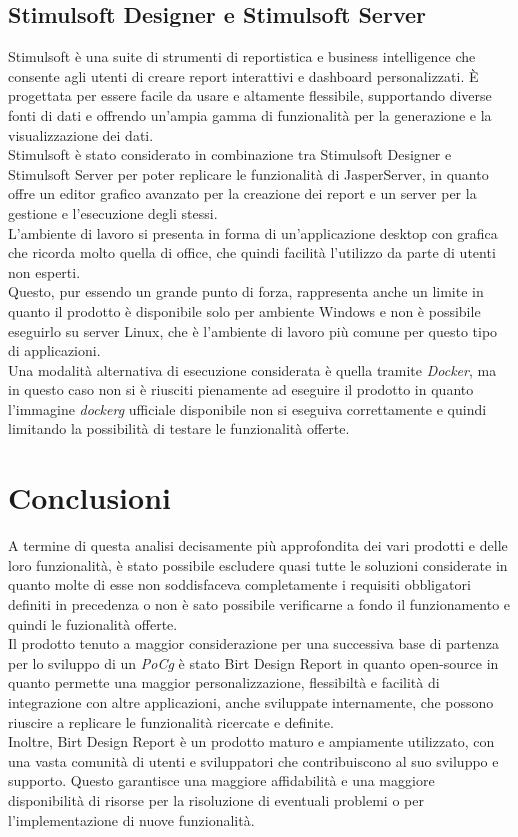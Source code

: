     \subsection{Stimulsoft Designer e Stimulsoft Server}
    \label{sec:Stimulsoft}
    Stimulsoft è una suite di strumenti di reportistica e business intelligence che consente agli utenti di creare report interattivi e dashboard personalizzati. È progettata per essere facile da usare e altamente flessibile, supportando diverse fonti di dati e offrendo un'ampia gamma di funzionalità per la generazione e la visualizzazione dei dati.\\
    Stimulsoft è stato considerato in combinazione tra Stimulsoft Designer e Stimulsoft Server per poter replicare le funzionalità di JasperServer, in quanto offre un editor grafico avanzato per la creazione dei report e un server per la gestione e l'esecuzione degli stessi.\\
    L'ambiente di lavoro si presenta in forma di un'applicazione desktop con grafica che ricorda molto quella di office, che quindi facilità l'utilizzo da parte di utenti non esperti.\\
    Questo, pur essendo un grande punto di forza, rappresenta anche un limite in quanto il prodotto è disponibile solo per ambiente Windows e non è possibile eseguirlo su server Linux, che è l'ambiente di lavoro più comune per questo tipo di applicazioni.\\
    Una modalità alternativa di esecuzione considerata è quella tramite \emph{Docker}, ma in questo caso non si è riusciti pienamente ad eseguire il prodotto in quanto l'immagine \emph{\gls{dockerg}} ufficiale disponibile non  si eseguiva correttamente e quindi limitando la possibilità di testare le funzionalità offerte.\\

\section{Conclusioni}
\label{sec:conclusioni}
    A termine di questa analisi decisamente più approfondita dei vari prodotti e delle loro funzionalità, è stato possibile escludere quasi tutte le soluzioni considerate in quanto molte di esse non soddisfaceva completamente i requisiti obbligatori definiti in precedenza o non è sato possibile verificarne a fondo il funzionamento e quindi le fuzionalità offerte.\\
    Il prodotto tenuto a maggior considerazione per una successiva base di partenza per lo sviluppo di un \emph{\gls{PoCg}} è stato Birt Design Report in quanto open-source in quanto permette una maggior personalizzazione, flessibiltà e facilità di integrazione con altre applicazioni, anche sviluppate internamente, che possono riuscire a replicare le funzionalità ricercate e definite.\\
    Inoltre, Birt Design Report è un prodotto maturo e ampiamente utilizzato, con una vasta comunità di utenti e sviluppatori che contribuiscono al suo sviluppo e supporto. Questo garantisce una maggiore affidabilità e una maggiore disponibilità di risorse per la risoluzione di eventuali problemi o per l'implementazione di nuove funzionalità.\\
